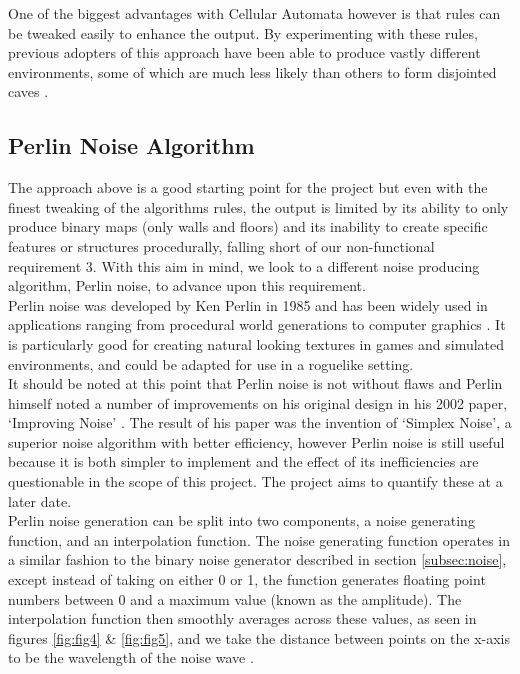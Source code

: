 \documentclass[12pt,a4paper]{article}
\begin{document}
One of the biggest advantages with Cellular Automata however is that rules can be tweaked easily to enhance the output. By experimenting with these rules, previous adopters of this approach have been able to produce vastly different environments, some of which are much less likely than others to form disjointed caves \cite{roguebasin}. \\




\subsection{Perlin Noise Algorithm}


The approach above is a good starting point for the project but even with the finest tweaking of the algorithms rules, the output is limited by its ability to only produce binary maps (only walls and floors) and its inability to create specific features or structures procedurally, falling short of our non-functional requirement 3. With this aim in mind, we look to a different noise producing algorithm, Perlin noise, to advance upon this requirement. \\


Perlin noise was developed by Ken Perlin in 1985 and has been widely used in applications ranging from procedural world generations to computer graphics \cite{imagesynth} \cite{surveyPNF}. It is particularly good for creating natural looking textures in games and simulated environments, and could be adapted for use in a roguelike setting.\\

It should be noted at this point that Perlin noise is not without flaws and Perlin himself noted a number of improvements on his original design in his 2002 paper, `Improving Noise' \cite{improvepnoise}. The result of his paper was the invention of `Simplex Noise', a superior noise algorithm with better efficiency, however Perlin noise is still useful because it is both simpler to implement and the effect of its inefficiencies are questionable in the scope of this project. The project aims to quantify these at a later date. \\

Perlin noise generation can be split into two components, a noise generating function, and an interpolation function. The noise generating function operates in a similar fashion to the binary noise generator described in section \ref{subsec:noise}, except instead of taking on either 0 or 1, the function generates floating point numbers between 0 and a maximum value (known as the amplitude). The interpolation function then smoothly averages across these values, as seen in figures \ref{fig:fig4} \& \ref{fig:fig5}, and we take the distance between points on the x-axis to be the wavelength of the noise wave \cite{Howuseperlin}. 
\end{document}
